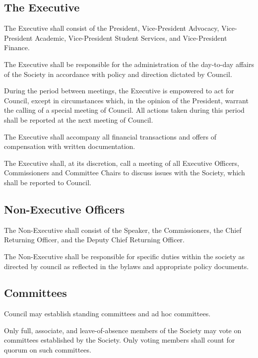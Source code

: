 \subsection{The Executive}
	\begin{longenum}[label*=\thesubsection.\arabic*., align=left]
	\item The Executive shall consist of the President, Vice-President Advocacy, Vice-President Academic, Vice-President Student Services, and Vice-President Finance. 
    \item The Executive shall be responsible for the administration of the day-to-day affairs of the Society in accordance with policy and direction dictated by Council.
    \item During the period between meetings, the Executive is empowered to act for Council, except in circumstances which, in the opinion of the President, warrant the calling of a special meeting of Council. All actions taken during this period shall be reported at the next meeting of Council.
    \item The Executive shall accompany all financial transactions and offers of compensation with written documentation. 
    \item The Executive shall, at its discretion, call a meeting of all Executive Officers, Commissioners and Committee Chairs to discuss issues with the Society, which shall be reported to Council. 

 
\end{longenum}
\subsection{Non-Executive Officers}
	\begin{longenum}[label*=\thesubsection.\arabic*., align=left]
	\item The Non-Executive shall consist of the Speaker, the Commissioners, the Chief Returning Officer, and the Deputy Chief Returning Officer. 
    \item The Non-Executive shall be responsible for specific duties within the society as directed by council as reflected in the bylaws and appropriate policy documents.
\end{longenum}
\subsection{Committees}
	\begin{longenum}[label*=\thesubsection.\arabic*., align=left]
	\item Council may establish standing committees and ad hoc committees.
    \item Only full, associate, and leave-of-absence members of the Society may vote on committees established by the Society. Only voting members shall count for quorum on such committees.
\end{longenum}
